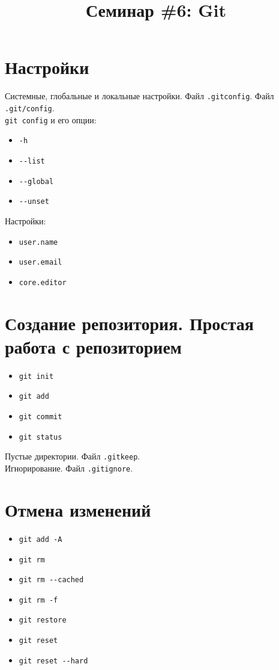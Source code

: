 \documentclass{article}
\begin{document}
\title{Семинар \#6: Git \vspace{-5ex}}\date{}\maketitle

\section{Настройки}
Системные, глобальные и локальные настройки. Файл \texttt{.gitconfig}. Файл \texttt{.git/config}.\\
\texttt{git config} и его опции:
\begin{itemize}
\item \texttt{-h}
\item \texttt{-{}-list}
\item \texttt{-{}-global}
\item \texttt{-{}-unset}
\end{itemize}

Настройки:
\begin{itemize}
\item \texttt{user.name}
\item \texttt{user.email}
\item \texttt{core.editor}
\end{itemize}


\section{Создание репозитория. Простая работа с репозиторием}
\begin{itemize}
\item \texttt{git init}
\item \texttt{git add}
\item \texttt{git commit}
\item \texttt{git status}
\end{itemize}
Пустые директории. Файл \texttt{.gitkeep}.\\
Игнорирование. Файл \texttt{.gitignore}.


\section{Отмена изменений}
\begin{itemize}
\item \texttt{git add -A}
\item \texttt{git rm}
\item \texttt{git rm -{}-cached}
\item \texttt{git rm -f}
\item \texttt{git restore}
\item \texttt{git reset}
\item \texttt{git reset -{}-hard}
\end{itemize}
\end{document}
